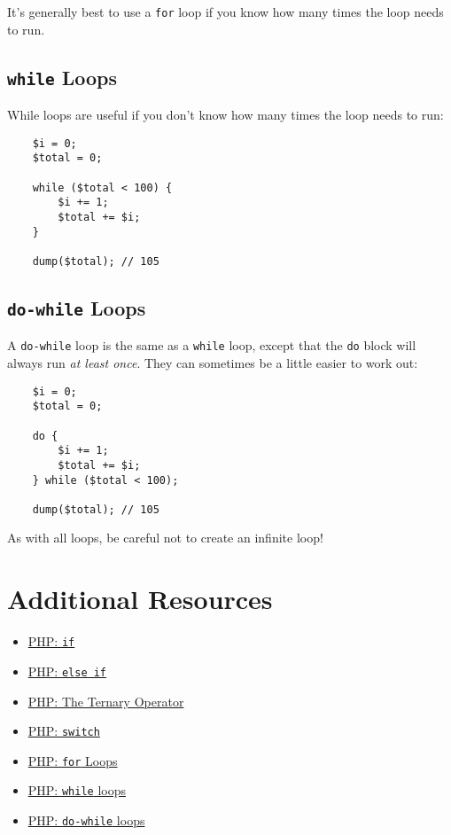 It's generally best to use a \texttt{for} loop if you know how many times the loop needs to run.

\subsection{\texttt{while} Loops}

While loops are useful if you don't know how many times the loop needs to run:

\begin{verbatim}
    $i = 0;
    $total = 0;

    while ($total < 100) {
        $i += 1;
        $total += $i;
    }

    dump($total); // 105
\end{verbatim}

\subsection{\texttt{do-while} Loops}

A \texttt{do-while} loop is the same as a \texttt{while} loop, except that the \texttt{do} block will always run \textit{at least once}. They can sometimes be a little easier to work out:

\begin{verbatim}
    $i = 0;
    $total = 0;

    do {
        $i += 1;
        $total += $i;
    } while ($total < 100);

    dump($total); // 105
\end{verbatim}

\hr

As with all loops, be careful not to create an infinite loop!


\pagebreak


\section{Additional Resources}

\begin{itemize}[leftmargin=*]
    \item \href{http://www.php.net/manual/en/control-structures.if.php}{PHP: \texttt{if}}
    \item \href{http://www.php.net/manual/en/control-structures.elseif.php}{PHP: \texttt{else if}}
    \item \href{https://www.php.net/manual/en/language.operators.comparison.php#language.operators.comparison.ternary}{PHP: The Ternary Operator}
    \item \href{http://www.php.net/manual/en/control-structures.switch.php}{PHP: \texttt{switch}}
    \item \href{http://www.php.net/manual/en/control-structures.for.php}{PHP: \texttt{for} Loops}
    \item \href{http://www.php.net/manual/en/control-structures.while.php}{PHP: \texttt{while} loops}
    \item \href{http://www.php.net/manual/en/control-structures.do.while.php}{PHP: \texttt{do-while} loops}
\end{itemize}
